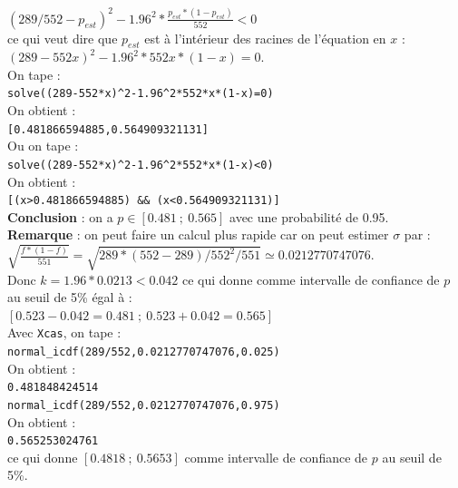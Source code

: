 \documentclass[a4paper,11pt]{book}
\begin{document}
\begin{itemize}
$(289/552-p_{est})^2-1.96^2*\frac{p_{est}*(1-p_{est})}{552}<0$\\
ce qui veut dire que $p_{est}$ est \`a l'int\'erieur des 
racines de l'\'equation en $x$ :\\
$(289-552x)^2-1.96^2*552x*(1-x)=0$.\\
On tape :\\
{\tt solve((289-552*x)\verb|^|2-1.96\verb|^|2*552*x*(1-x)=0)}\\
On obtient :\\
{\tt [0.481866594885,0.564909321131]}\\
Ou on tape :\\
{\tt solve((289-552*x)\verb|^|2-1.96\verb|^|2*552*x*(1-x)<0)}\\
On obtient :\\
{\tt [(x>0.481866594885) \&\& (x<0.564909321131)]}\\
{\bf Conclusion} : on a $ p \in [0.481 \ ;\  0.565]$ avec une probabilit\'e de 
0.95.\\
{\bf Remarque} : on peut faire un calcul plus rapide car
on peut estimer $\sigma$ par :
$\sqrt{\frac{f*(1-f)}{551}}=\sqrt{289*(552-289)/552^2/551}\simeq0.0212770747076$.\\
 Donc $k=1.96*0.0213 <0.042$ ce qui donne comme intervalle de
confiance de $p$ au seuil de 5\% \'egal \`a :\\
 $[0.523-0.042=0.481\ ;\  0.523+0.042=0.565]$\\
Avec {\tt Xcas}, on tape :\\
{\tt normal\_icdf(289/552,0.0212770747076,0.025)} \\
On obtient :\\
{\tt 0.481848424514}\\
{\tt normal\_icdf(289/552,0.0212770747076,0.975)} \\
On obtient :\\
{\tt 0.565253024761}\\
ce qui donne $[0.4818\ ;\  0.5653]$ comme intervalle de
confiance de $p$ au seuil de 5\%.
 

\end{itemize}
\end{document}

